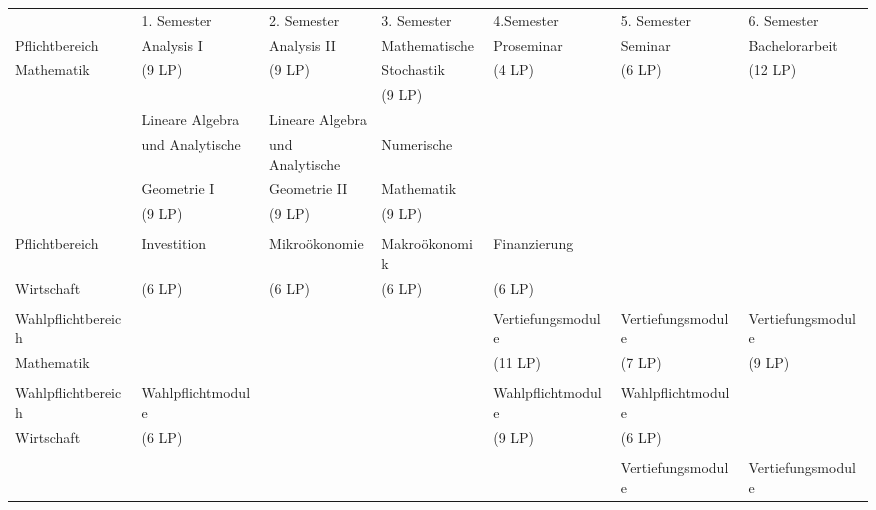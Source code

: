 \begin{center}
\begin{tabular}{||l||l|l|l|l|l|l||}
\hhline{|t:=:t:=t=t=t=t=t=:t|}
\hspace*{25mm}&1. Semester\hspace*{8ex}&2. Semester\hspace*{8ex}&3. Semester\hspace*{8ex}&4.Semester\hspace*{8ex}&5. Semester\hspace*{8ex}&6. Semester\hspace*{8ex}\\
\hhline{|:=::======:|} Pflichtbereich&Analysis I&Analysis II&Mathematische&Proseminar&Seminar&Bachelorarbeit\\
\hhline{||~||~|~|~|~|~|~||} Mathematik &(9 LP)&(9 LP)&Stochastik&(4 LP)&(6 LP)& (12 LP)\\
\hhline{||~||~|~|~|~|~|~||} &&&(9 LP)&&&\\
\hhline{||~||~|~|~|~|~|~||} &Lineare Algebra&Lineare Algebra&&&&\\ 
\hhline{||~||~|~|~|~|~|~||} &und Analytische&und Analytische&Numerische&&&\\ 
\hhline{||~||~|~|~|~|~|~||} &Geometrie I&Geometrie II&Mathematik&&&\\ 
\hhline{||~||~|~|~|~|~|~||} &(9 LP)&(9 LP)&(9 LP)&&&\\
\hhline{||~||~|~|~|~|~|~||} &&&&&&\\
\hhline{|:=::======:|} Pflichtbereich&Investition&Mikroökonomie&Makroökonomik&Finanzierung&&\\
\hhline{||~||~|~|~|~|~|~||} Wirtschaft&(6 LP)&(6 LP)&(6 LP)&(6 LP)&&\\
\hhline{||~||~|~|~|~|~|~||} &&&&&&\\
\hhline{|:=::======:|} Wahlpflichtbereich&&&&Vertiefungsmodule&Vertiefungsmodule&Vertiefungsmodule\\
\hhline{||~||~|~|~|~|~|~||} Mathematik&&&&(11 LP)&(7 LP)&(9 LP)\\
\hhline{||~||~|~|~|~|~|~||} &&&&&&\\
\hhline{|:=::======:|} Wahlpflichtbereich&Wahlpflichtmodule&&&Wahlpflichtmodule&Wahlpflichtmodule&\\
\hhline{||~||~|~|~|~|~|~||} Wirtschaft&(6 LP)&&&(9 LP)&(6 LP)&\\
\hhline{||~||~|~|~|~|~|~||} &&&&&&\\
\hhline{||~||~|~|~|~|~|~||} &&&&&Vertiefungsmodule&Vertiefungsmodule\\

\end{tabular}
\end{center}
